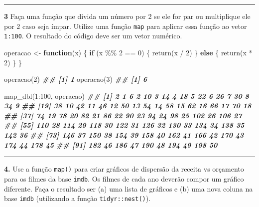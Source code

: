 \documentclass[
]{book}
\newenvironment{Shaded}{\begin{snugshade}}{\end{snugshade}}
\newcommand{\ControlFlowTok}[1]{\textcolor[rgb]{0.13,0.29,0.53}{\textbf{#1}}}
\newcommand{\DecValTok}[1]{\textcolor[rgb]{0.00,0.00,0.81}{#1}}
\newcommand{\DocumentationTok}[1]{\textcolor[rgb]{0.56,0.35,0.01}{\textbf{\textit{#1}}}}
\newcommand{\FunctionTok}[1]{\textcolor[rgb]{0.00,0.00,0.00}{#1}}
\newcommand{\NormalTok}[1]{#1}
\newcommand{\OtherTok}[1]{\textcolor[rgb]{0.56,0.35,0.01}{#1}}
\newcommand{\SpecialCharTok}[1]{\textcolor[rgb]{0.00,0.00,0.00}{#1}}
\begin{document}
\begin{center}\rule{0.5\linewidth}{0.5pt}\end{center}

\textbf{3} Faça uma função que divida um número por 2 se ele for par ou multiplique ele por 2 caso seja ímpar. Utilize uma função \texttt{map} para aplicar essa função ao vetor \texttt{1:100}. O resultado do código deve ser um vetor numérico.

\begin{Shaded}
\begin{Highlighting}[]
\NormalTok{operacao }\OtherTok{\textless{}{-}} \ControlFlowTok{function}\NormalTok{(x) \{}
  \ControlFlowTok{if}\NormalTok{ (x }\SpecialCharTok{\%\%} \DecValTok{2} \SpecialCharTok{==} \DecValTok{0}\NormalTok{) \{}
    \FunctionTok{return}\NormalTok{(x }\SpecialCharTok{/} \DecValTok{2}\NormalTok{)}
\NormalTok{  \} }\ControlFlowTok{else}\NormalTok{ \{}
    \FunctionTok{return}\NormalTok{(x }\SpecialCharTok{*} \DecValTok{2}\NormalTok{)}
\NormalTok{  \}}
\NormalTok{\}}

\FunctionTok{operacao}\NormalTok{(}\DecValTok{2}\NormalTok{)}
\DocumentationTok{\#\# [1] 1}
\FunctionTok{operacao}\NormalTok{(}\DecValTok{3}\NormalTok{)}
\DocumentationTok{\#\# [1] 6}

\FunctionTok{map\_dbl}\NormalTok{(}\DecValTok{1}\SpecialCharTok{:}\DecValTok{100}\NormalTok{, operacao)}
\DocumentationTok{\#\#   [1]   2   1   6   2  10   3  14   4  18   5  22   6  26   7  30   8  34   9}
\DocumentationTok{\#\#  [19]  38  10  42  11  46  12  50  13  54  14  58  15  62  16  66  17  70  18}
\DocumentationTok{\#\#  [37]  74  19  78  20  82  21  86  22  90  23  94  24  98  25 102  26 106  27}
\DocumentationTok{\#\#  [55] 110  28 114  29 118  30 122  31 126  32 130  33 134  34 138  35 142  36}
\DocumentationTok{\#\#  [73] 146  37 150  38 154  39 158  40 162  41 166  42 170  43 174  44 178  45}
\DocumentationTok{\#\#  [91] 182  46 186  47 190  48 194  49 198  50}
\end{Highlighting}
\end{Shaded}

\begin{center}\rule{0.5\linewidth}{0.5pt}\end{center}

\textbf{4.} Use a função \texttt{map()} para criar gráficos de dispersão da receita vs orçamento para os filmes da base \texttt{imdb}. Os filmes de cada ano deverão compor um gráfico diferente. Faça o resultado ser (a) uma lista de gráficos e (b) uma nova coluna na base \texttt{imdb} (utilizando a função \texttt{tidyr::nest()}).
\end{document}
